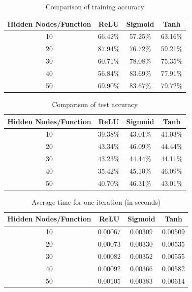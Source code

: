\begin{table}[H]
	\centering
	\caption{Comparison of training accuracy}
	\label{table:trainAcc}	
	\begin{tabular}{c | c | c | c }
		\hline \hline
		Hidden Nodes/Function	&	ReLU	& 	Sigmoid		&	 Tanh 	\\[0.1cm]
		\hline
		10						&	66.42\%	&	57.25\%		&	 63.16\% \\[0.1cm]
		20						&	87.94\%	&	76.72\%		&	 59.21\% \\[0.1cm]
		30						&	60.71\%	&	78.08\%		&	 75.35\% \\[0.1cm]
		40						&	56.84\%	&	83.69\%		&	 77.91\% \\[0.1cm]
		50						&	69.90\%	&	83.67\%		&	 79.72\% \\[0.1cm]
		\hline	
	\end{tabular}
\end{table}

\begin{table}[H]
	\centering
	\caption{Comparison of test accuracy}
	\label{table:testAcc}	
	\begin{tabular}{c | c | c | c }
		\hline \hline
		Hidden Nodes/Function	&	ReLU	& 	Sigmoid		&	 Tanh 	\\[0.1cm]
		\hline
		10						&	39.38\%	&	43.01\%		&	 41.03\% \\[0.1cm]
		20						&	43.34\%	&	46.09\%		&	 44.44\% \\[0.1cm]
		30						&	43.23\%	&	44.44\%		&	 44.11\% \\[0.1cm]
		40						&	35.42\%	&	45.10\%		&	 46.09\% \\[0.1cm]
		50						&	40.70\%	&	46.31\%		&	 43.01\% \\[0.1cm]
		\hline	
	\end{tabular}
\end{table}


\begin{table}[H]
	\centering
	\caption{Average time for one iteration (in seconds)}
	\label{table:time}	
	\begin{tabular}{c | c | c | c }
		\hline \hline
		Hidden Nodes/Function	&	ReLU	& 	Sigmoid		&	 Tanh 	\\[0.1cm]
		\hline
		10						&	0.00067	&	0.00309		&	 0.00509 \\[0.1cm]
		20						&	0.00073	&	0.00330		&	 0.00535 \\[0.1cm]
		30						&	0.00082	&	0.00352		&	 0.00555 \\[0.1cm]
		40						&	0.00092	&	0.00366		&	 0.00582 \\[0.1cm]
		50						&	0.00105	&	0.00383		&	 0.00614 \\[0.1cm]
		\hline	
	\end{tabular}
\end{table}


